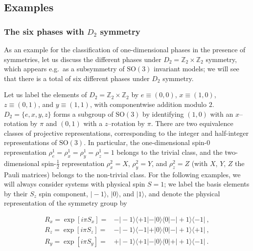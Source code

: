 \documentclass[twocolumn,superscriptaddress,prb,linenumbers]{revtex4-1}
\newcommand{\ket}[1]{\vert#1\rangle}
\newcommand{\bra}[1]{\langle#1\vert}
\begin{document}
\subsection{Examples
    \label{sec:examples}}


\subsubsection{The six phases with $D_2$ symmetry}


As an example for the classification of one-dimensional phases in the
presence of symmetries, let us discuss the different phases under
$D_2=\mathbb Z_2\times \mathbb Z_2$ symmetry, which appears e.g.\ as a
subsymmetry of $\mathrm{SO}(3)$ invariant models; we will see that there
is a total of six different phases under $D_2$ symmetry.

Let us label the elements of $D_2=\mathbb Z_2\times \mathbb Z_2$ by
$e\equiv(0,0)$, $x\equiv(1,0)$, $z\equiv(0,1)$, and $y\equiv(1,1)$, with
componentwise addition modulo $2$. $D_2=\{e,x,y,z\}$ forms a subgroup of
$\mathrm{SO}(3)$ by identifying $(1,0)$ with an $x$--rotation by $\pi$ and
$(0,1)$ with a $z$--rotation by $\pi$.  There are two equivalence classes
of projective representations, corresponding to the integer and
half-integer representations of $\mathrm{SO}(3)$. In particular, the
one-dimensional spin-$0$ representation
$\rho^1_e=\rho^1_x=\rho^1_y=\rho^1_z=1$ belongs to the trivial class, and
the two-dimensional spin-$\tfrac12$ representation $\rho^2_x=X$,
$\rho^2_y=Y$, and $\rho^2_z=Z$ (with $X$, $Y$, $Z$ the Pauli matrices)
belongs to the non-trivial class. For the following examples, we will
always consider systems with physical spin $S=1$; we label the basis
elements by their $S_z$ spin component, $\ket{\!-\!1}$, $\ket{0}$, and
$\ket{1}$,  and denote the physical representation of the symmetry group by
\begin{linenomath}
    \begin{align*}
        R_x=\exp[i\pi S_x]= &
        -\ket{-1}\bra{+1}-\ket{0}\bra{0}-\ket{+1}\bra{-1}\ , \\
        R_z=\exp[i\pi S_z]= &
        -\ket{-1}\bra{-1}+\ket{0}\bra{0}-\ket{+1}\bra{+1}\ , \\
        R_y=\exp[i\pi S_y]= &
        +\ket{-1}\bra{+1}-\ket{0}\bra{0}+\ket{+1}\bra{-1} \ .
    \end{align*}
\end{linenomath}
\end{document}

